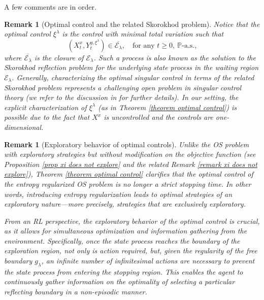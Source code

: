 \documentclass[11pt]{amsart}
\newtheorem{remark}[theorem]{Remark}
\theoremstyle{plain}
\def \P{\mathbb{P}}
\numberwithin{equation}{section}
\begin{document}
A few comments are in order.
\begin{remark}[Optimal control and the related Skorokhod problem]
Notice that the optimal control $\xi^{\lambda}$ is the control with minimal total variation such that
\begin{equation*}
( X^x_{t}, Y_{t}^{y, \xi^{\lambda}}) \in \overline{\mathcal E_\lambda}, \quad \text{for any $t \geq 0, \ \P$-a.s.,}    
\end{equation*}
where $ \overline{\mathcal E_\lambda}$ is the closure of ${\mathcal  E_\lambda}$.
Such a process is also known as the solution to the Skorokhod reflection problem for the underlying state process in the waiting region ${\mathcal  E_\lambda}$. 
Generally, characterizing the optimal singular control in terms of the related Skorokhod problem represents a challenging open problem in singular control theory (we refer to the discussion in \cite{dianetti2021multidimensional} for further details).
In our setting, the explicit characterization of $\xi^\lambda$ (as in Theorem \ref{theorem optimal control}) is possible due to the fact that $X^x$ is uncontrolled and the controls are one-dimensional.
\end{remark}

\begin{remark}[Exploratory behavior of optimal controls]\label{remark the optimal control randomizes}
Unlike the OS problem with exploratory strategies but without modification on the objective function (see Proposition \ref{prop xi does not explore} and the related Remark \ref{remark xi does not explore}), Theorem \ref{theorem optimal control} clarifies that the optimal control of the entropy regularized OS problem is no longer a strict stopping time. 
In other words, introducing entropy regularization leads to optimal strategies of an exploratory nature—more precisely, strategies that are exclusively exploratory.

From an RL perspective, the exploratory behavior of the optimal control is crucial, as it allows for simultaneous optimization and information gathering from the environment. Specifically, once the state process reaches the boundary of the exploration region, not only is action required, but, given the regularity of the free boundary $g_\lambda$, an infinite number of infinitesimal actions are necessary to prevent the state process from entering the stopping region. This enables the agent to continuously gather information on the optimality of selecting a particular reflecting boundary in a non-episodic manner.
\end{remark}
\end{document}
